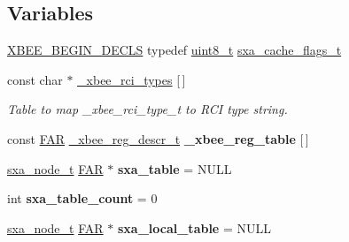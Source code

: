 \subsection*{Variables}
\begin{DoxyCompactItemize}
\item 
\hyperlink{group__hal_ga336bff4f4a6012aacc4468132bbd3d7f}{X\-B\-E\-E\-\_\-\-B\-E\-G\-I\-N\-\_\-\-D\-E\-C\-L\-S} typedef \hyperlink{group__hal_gae1affc9ca37cfb624959c866a73f83c2}{uint8\-\_\-t} \hyperlink{group___s_x_a_ga21b45e50d83fcc1363c4239313e88c06}{sxa\-\_\-cache\-\_\-flags\-\_\-t}
\item 
const char $\ast$ \hyperlink{group___s_x_a_ga62238d483c628f8c996664ff0f47ccef}{\-\_\-xbee\-\_\-rci\-\_\-types} \mbox{[}$\,$\mbox{]}
\begin{DoxyCompactList}\small\item\em Table to map \-\_\-xbee\-\_\-rci\-\_\-type\-\_\-t to R\-C\-I type string. \end{DoxyCompactList}\item 
\hypertarget{group___s_x_a_ga38e53826af221faaa9c92525dfeb8ed3}{const \hyperlink{group__hal_gaef060b3456fdcc093a7210a762d5f2ed}{F\-A\-R} \hyperlink{struct__xbee__reg__descr__t}{\-\_\-xbee\-\_\-reg\-\_\-descr\-\_\-t} {\bfseries \-\_\-xbee\-\_\-reg\-\_\-table} \mbox{[}$\,$\mbox{]}}\label{group___s_x_a_ga38e53826af221faaa9c92525dfeb8ed3}

\item 
\hypertarget{group___s_x_a_gafaf56c450e4f885ee2d8fd0dfc0bc0a9}{\hyperlink{structsxa__node__t}{sxa\-\_\-node\-\_\-t} \hyperlink{group__hal_gaef060b3456fdcc093a7210a762d5f2ed}{F\-A\-R} $\ast$ {\bfseries sxa\-\_\-table} = N\-U\-L\-L}\label{group___s_x_a_gafaf56c450e4f885ee2d8fd0dfc0bc0a9}

\item 
\hypertarget{group___s_x_a_gaf690fd80428627087e91a1e1b28fad0f}{int {\bfseries sxa\-\_\-table\-\_\-count} = 0}\label{group___s_x_a_gaf690fd80428627087e91a1e1b28fad0f}

\item 
\hypertarget{group___s_x_a_ga01bfbcf717c18bfb7825eba4715b3ad4}{\hyperlink{structsxa__node__t}{sxa\-\_\-node\-\_\-t} \hyperlink{group__hal_gaef060b3456fdcc093a7210a762d5f2ed}{F\-A\-R} $\ast$ {\bfseries sxa\-\_\-local\-\_\-table} = N\-U\-L\-L}\label{group___s_x_a_ga01bfbcf717c18bfb7825eba4715b3ad4}


\end{DoxyCompactItemize}

